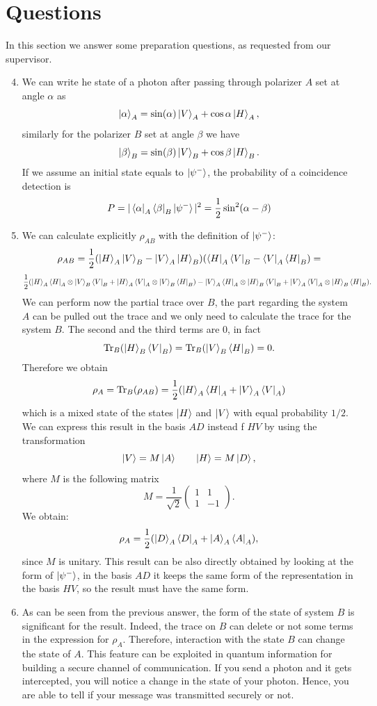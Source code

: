 \documentclass[a4paper,10pt]{article}
\begin{document}
\section{Questions}
In this section we answer some preparation questions, as requested from our supervisor.
\begin{enumerate}
\setcounter{enumi}{3}
\item We can write he state of a photon after passing through polarizer $A$ set at angle $\alpha$ as
\[\ket{\alpha}_A = \sin(\alpha) \ket{V}_A + \cos{\alpha}\ket{H}_A,\] 
similarly for the polarizer $B$ set at angle $\beta$ we have \[\ket{\beta}_B = \sin(\beta) \ket{V}_B+ \cos{\beta}\ket{H}_B.\]
If we assume an initial state equals to $\ket{\psi^-}$, the probability of a coincidence detection is
\[P = |\bra{\alpha}_A\bra{\beta}_B \ket{\psi^-}|^2 = \frac{1}{2}\sin^2(\alpha-\beta)\]
\item We can calculate explicitly $\rho_{AB}$ with the definition of $\ket{\psi^-}$:
\[\rho_{AB} = \frac{1}{2}(\ket{H}_A\ket{V}_B - \ket{V}_A\ket{H}_B)(\bra{H}_A\bra{V}_B - \bra{V}_A\bra{H}_B) = \]\[\frac{1}{2}(\ket{H}_A\bra{H}_A \otimes \ket{V}_B\bra{V}_B +\ket{H}_A\bra{V}_A \otimes \ket{V}_B\bra{H}_B)-\ket{V}_A\bra{H}_A \otimes \ket{H}_B\bra{V}_B + \ket{V}_A\bra{V}_A \otimes \ket{H}_B\bra{H}_B ).\]
We can perform now the partial trace over $B$, the part regarding the system $A$ can be pulled out the trace and we only need to calculate the trace for the system $B$. The second and the third terms are 0, in fact
\[\text{Tr}_B(\ket{H}_B\bra{V}_B) = \text{Tr}_B(\ket{V}_B\bra{H}_B) = 0. \]
Therefore we obtain
\[\rho_A = \text{Tr}_B(\rho_{AB}) = \frac{1}{2}(\ket{H}_A \bra{H}_A +\ket{V}_A \bra{V}_A )\]
which is a mixed state of the states $\ket{H}$ and $\ket{V}$ with equal probability $1/2$. We can express this result in the basis $AD$ instead f $HV$ by using the transformation
\[\ket{V} = M \ket{A} \qquad \ket{H} = M \ket{D},\]
where $M$ is the following matrix
\[M = \frac{1}{\sqrt{2}}\begin{pmatrix}
  1 & 1  \\
  1 & -1
 \end{pmatrix}.\]
 We obtain:
 \[\rho_A = \frac{1}{2}(\ket{D}_A \bra{D}_A +\ket{A}_A \bra{A}_A),\]
since $M$ is unitary. This result can be also directly obtained by looking at the form of $\ket{\psi^-}$, in the basis $AD$ it keeps the same form of the representation in the basis $HV$, so the result must have the same form.
\item As can be seen from the previous answer, the form of the state of system $B$ is significant for the result. Indeed, the trace on $B$ can delete or not some terms in the expression for $\rho_A$. Therefore, interaction with the state $B$ can change the state of $A$. This feature can be exploited in quantum information for building a secure channel of communication. If you send a photon and it gets intercepted, you will notice a change in the state of your photon. Hence, you are able to tell if your message was transmitted securely or not.
\end{enumerate}
\end{document}
